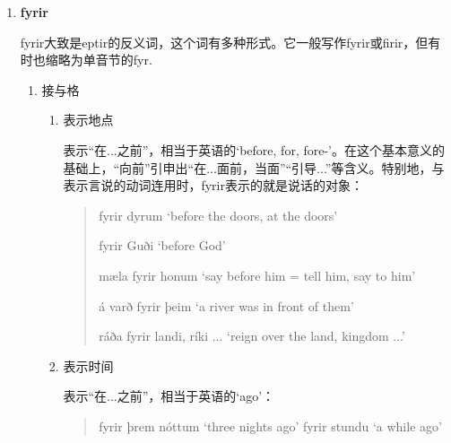 \begin{enumerate}[itemindent=1em, label=\textbf{\arabic*}.]
\begin{enumerate}
                    表示时间含义的“在...之后”时用宾格：
                    \begin{quote}
                        ár eptir ár `year after year'
                    \end{quote}
                    eptir e-n常表示“在某人死后；继承某人的遗产”之类的含义：
                    \begin{quote}
                        taka arf eptir f\k{o}\dh ur sinn `take inheritance after his father'
                    \end{quote}
          \end{enumerate}

    \item \textbf{fyrir}

          fyrir大致是eptir的反义词，这个词有多种形式。它一般写作fyrir或firir，但有时也缩略为单音节的fyr.
          \begin{enumerate}
              \item 接与格

                    \begin{enumerate}
                        \item 表示地点

                              表示“在...之前”，相当于英语的`before, for, fore-'。在这个基本意义的基础上，“向前”引申出“在...面前，当面”“引导...”等含义。特别地，与表示言说的动词连用时，fyrir表示的就是说话的对象：
                              \begin{quote}
                                  fyrir dyrum `before the doors, at the doors'

                                  fyrir Guði `before God'

                                  mæla fyrir honum `say before him = tell him, say to him'

                                  á varð fyrir þeim `a river was in front of them'

                                  ráða fyrir landi, ríki ... `reign over the land, kingdom ...'
                              \end{quote}

                        \item 表示时间

                              表示“在...之前”，相当于英语的`ago'：
                              \begin{quote}
                                  fyrir þrem nóttum `three nights ago'
                                  fyrir stundu `a while ago'
                              \end{quote}


\end{enumerate}
\end{enumerate}
\end{enumerate}
